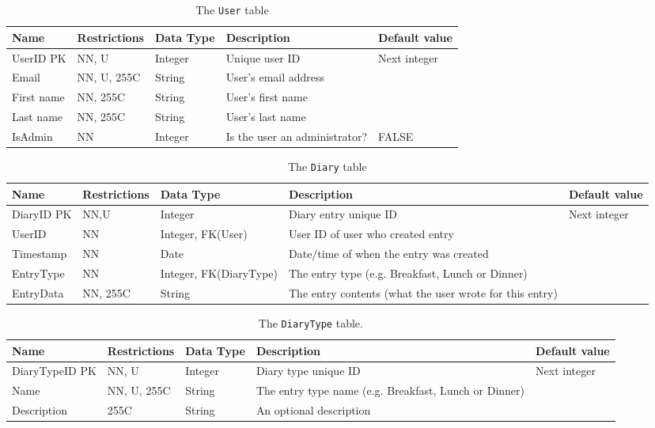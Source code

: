 \begin{table}[H]
  \centering
  \caption{The \texttt{User} table}
    \begin{tabularx}{\textwidth}{lllXl}
    \hline
    Name  & Restrictions & Data Type & Description & Default value \\
    \hline
    UserID PK & NN, U & Integer & Unique user ID & Next integer \\
    Email & NN, U, 255C & String & User's email address &  \\
    First name & NN, 255C & String & User's first name &  \\
    Last name & NN, 255C & String & User's last name &  \\
    IsAdmin & NN    & Integer & Is the user an administrator? & FALSE \\
    \hline
    \end{tabularx}%
  \label{tab:dd:User}%
\end{table}%


\begin{table}[H]
  \centering
  \caption{The \texttt{Diary} table}
    \begin{tabularx}{\textwidth}{llp{2.5cm}Xl}
    \hline
    Name  & Restrictions & Data Type & Description & Default value \\
    \hline
    DiaryID PK & NN,U  & Integer & Diary entry unique ID & Next integer \\
    UserID & NN    & Integer, FK(User) & User ID of user who created entry &  \\
    Timestamp & NN    & Date  & Date/time of when the entry was created &  \\
    EntryType & NN    & Integer, FK(DiaryType) & The entry type (e.g. Breakfast, Lunch or Dinner) &  \\
    EntryData & NN, 255C & String & The entry contents (what the user wrote for this entry) &  \\
    \hline
    \end{tabularx}%
  \label{tab:dd:Diary}%
\end{table}%


\begin{table}[H]
  \centering
  \caption{The \texttt{DiaryType} table.}
    \begin{tabularx}{\textwidth}{lllXl}
    \hline
    Name  & Restrictions & Data Type & Description & Default value \\
    \hline
    DiaryTypeID PK & NN, U & Integer & Diary type unique ID & Next integer \\
    Name  & NN, U, 255C & String & The entry type name (e.g. Breakfast, Lunch or Dinner) &  \\
    Description & 255C  & String & An optional description &  \\
    \hline
    \end{tabularx}%
  \label{tab:dd:DiaryType}%
\end{table}%


